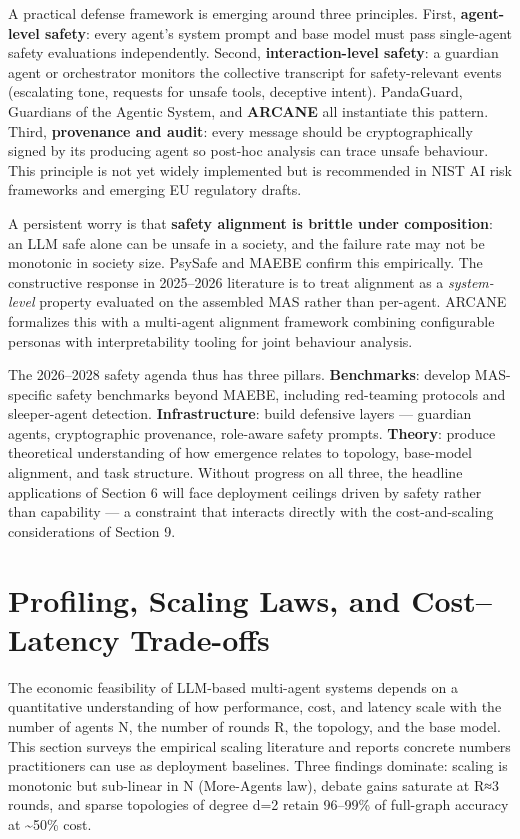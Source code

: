 \documentclass{article}
\begin{document}
A practical defense framework is emerging around three principles. First, \textbf{agent-level safety}: every agent's system prompt and base model must pass single-agent safety evaluations independently. Second, \textbf{interaction-level safety}: a guardian agent or orchestrator monitors the collective transcript for safety-relevant events (escalating tone, requests for unsafe tools, deceptive intent). PandaGuard, Guardians of the Agentic System, and \textbf{ARCANE} \citep{masters2025arcaneamultiagentf} all instantiate this pattern. Third, \textbf{provenance and audit}: every message should be cryptographically signed by its producing agent so post-hoc analysis can trace unsafe behaviour. This principle is not yet widely implemented but is recommended in NIST AI risk frameworks and emerging EU regulatory drafts.

A persistent worry is that \textbf{safety alignment is brittle under composition}: an LLM safe alone can be unsafe in a society, and the failure rate may not be monotonic in society size. PsySafe and MAEBE confirm this empirically. The constructive response in 2025--2026 literature is to treat alignment as a \emph{system-level} property evaluated on the assembled MAS rather than per-agent. ARCANE formalizes this with a multi-agent alignment framework combining configurable personas with interpretability tooling for joint behaviour analysis.

The 2026--2028 safety agenda thus has three pillars. \textbf{Benchmarks}: develop MAS-specific safety benchmarks beyond MAEBE, including red-teaming protocols and sleeper-agent detection. \textbf{Infrastructure}: build defensive layers --- guardian agents, cryptographic provenance, role-aware safety prompts. \textbf{Theory}: produce theoretical understanding of how emergence relates to topology, base-model alignment, and task structure. Without progress on all three, the headline applications of Section 6 will face deployment ceilings driven by safety rather than capability --- a constraint that interacts directly with the cost-and-scaling considerations of Section 9.

\section{Profiling, Scaling Laws, and Cost--Latency Trade-offs}\label{profiling-scaling-laws-and-costlatency-trade-offs}

The economic feasibility of LLM-based multi-agent systems depends on a quantitative understanding of how performance, cost, and latency scale with the number of agents N, the number of rounds R, the topology, and the base model. This section surveys the empirical scaling literature and reports concrete numbers practitioners can use as deployment baselines. Three findings dominate: scaling is monotonic but sub-linear in N (More-Agents law), debate gains saturate at R≈3 rounds, and sparse topologies of degree d=2 retain 96--99\% of full-graph accuracy at \textasciitilde50\% cost.
\end{document}
